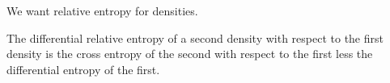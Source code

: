 

We want relative entropy for densities.


The differential relative entropy of
a second density with respect to the
first density is the cross entropy
of the second with respect to the first
less the differential entropy of the first.


